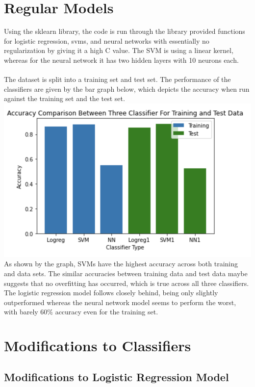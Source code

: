 \documentclass[11pt, oneside]{article}
\begin{document}
\section *{Regular Models}
Using the sklearn library, the code is run through the library provided functions for logistic regression, svms, and neural networks with essentially no regularization by giving it a high C value. The SVM is using a linear kernel, whereas for the neural network it has two hidden layers with 10 neurons each.\\\\The dataset is split into a training set and test set. The performance of the classifiers are given by the bar graph below, which depicts the accuracy when run against the training set and the test set. \\
\includegraphics{1}\\
As shown by the graph, SVMs have the highest accuracy across both training and data sets. The similar accuracies between training data and test data maybe suggests that no overfitting has occurred, which is true across all three classifiers.\\
The logistic regression model follows closely behind, being only slightly outperformed whereas the neural network model seems to perform the worst, with barely 60\% accuracy even for the training set.

\section *{Modifications to Classifiers}
\subsection *{Modifications to Logistic Regression Model}
\end{document}
